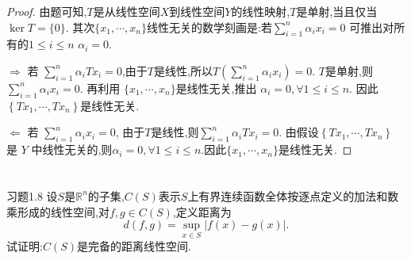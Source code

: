 \documentclass[lang = cn, scheme = chinese]{elegantbook}
\newcommand{\R}{\mathbb{R}}            %
\begin{document}
	\begin{proof} 
		由题可知,$T$是从线性空间$X$到线性空间$Y$的线性映射,$T$是单射,当且仅当 $\ker T=\{ 0\}$. 其次$\{x_{1}, \cdots, x_{n} \}$线性无关的数学刻画是:若$\sum_{i=1}^{n}\alpha_{i}x_{i}=0$ 可推出对所有的$1\leq i\leq n$ $\alpha_{i}=0$.
		
		$\Longrightarrow$ 若 $\sum_{i=1}^{n}\alpha_{i}Tx_{i}=0$,由于$T$是线性,所以$T(\sum_{i=1}^{n}\alpha_{i}x_{i})=0$. $T$是单射,则 $\sum_ {i=1}^{n}\alpha_{i}x_{i}=0$. 再利用 $\{x_{1}, \cdots, x_{n} \}$是线性无关,推出 $\alpha_{i}=0, \forall 1\leq i \leq n$. 因此 $\left\{T x_1, \cdots, T x_n\right\}$是线性无关.
		
		$\Longleftarrow$ 若 $\sum_{i=1}^{n}\alpha_{i}x_{i}=0$, 由于$T$是线性,则$\sum_{i=1}^{n}\alpha_{i}Tx_{i}=0$. 由假设$\left\{T x_1, \cdots, T x_n\right\}$ 是 $Y$ 中线性无关的,则$\alpha_{i}=0, \forall 1\leq i \leq n$.因此$\{x_{1}, \cdots, x_{n} \}$是线性无关.
	\end{proof}
	
	
	\chapter{}
	
	\begin{proposition}{习题1.8}
		设$S$是$\R^n$的子集,$C(S)$表示$S$上有界连续函数全体按逐点定义的加法和数乘形成的线性空间,对$f,g\in C(S)$,定义距离为
		$$
		d(f,g)=\sup_{x\in S}|f(x)-g(x)|.
		$$
		试证明:$C(S)$是完备的距离线性空间.
	\end{proposition}
	
\end{document}
